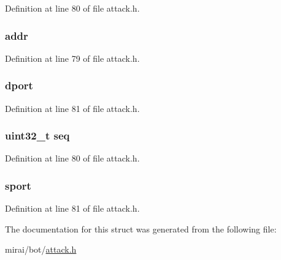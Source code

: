 Definition at line 80 of file attack.\+h.

\subsubsection[{\texorpdfstring{addr}{addr}}]{ addr}\hypertarget{structattack__stomp__data_a587426ea8fb6d0cbb271fa3abee2219c}{}\label{structattack__stomp__data_a587426ea8fb6d0cbb271fa3abee2219c}


Definition at line 79 of file attack.\+h.

\subsubsection[{\texorpdfstring{dport}{dport}}]{ dport}\hypertarget{structattack__stomp__data_ae1d2e53d4da413ae3925b7c40c0f3133}{}\label{structattack__stomp__data_ae1d2e53d4da413ae3925b7c40c0f3133}


Definition at line 81 of file attack.\+h.

\subsubsection[{\texorpdfstring{seq}{seq}}]{\setlength{\rightskip}{0pt plus 5cm}uint32\+\_\+t seq}\hypertarget{structattack__stomp__data_aaf1b939170b82732448a965a5b33ad4e}{}\label{structattack__stomp__data_aaf1b939170b82732448a965a5b33ad4e}


Definition at line 80 of file attack.\+h.

\subsubsection[{\texorpdfstring{sport}{sport}}]{ sport}\hypertarget{structattack__stomp__data_ace4d92a66754ba880f72f0d54f5c4f7d}{}\label{structattack__stomp__data_ace4d92a66754ba880f72f0d54f5c4f7d}


Definition at line 81 of file attack.\+h.



The documentation for this struct was generated from the following file\+:\begin{DoxyCompactItemize}
\item 
mirai/bot/\hyperlink{attack_8h}{attack.\+h}\end{DoxyCompactItemize}
